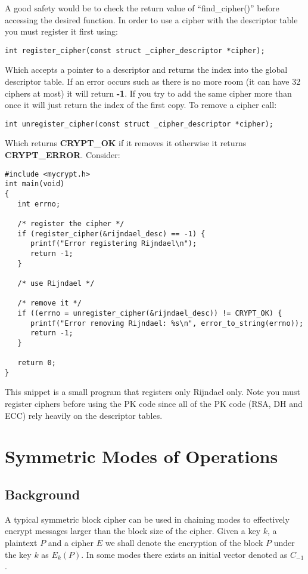 \documentclass[b5paper]{book}
\begin{document}
A good safety would be to check the return value of ``find\_cipher()'' before accessing the desired function.  In order
to use a cipher with the descriptor table you must register it first using:
\begin{verbatim}
int register_cipher(const struct _cipher_descriptor *cipher);
\end{verbatim}
Which accepts a pointer to a descriptor and returns the index into the global descriptor table.  If an error occurs such
as there is no more room (it can have 32 ciphers at most) it will return {\bf{-1}}.  If you try to add the same cipher more
than once it will just return the index of the first copy.  To remove a cipher call:
\begin{verbatim}
int unregister_cipher(const struct _cipher_descriptor *cipher);
\end{verbatim}
Which returns {\bf CRYPT\_OK} if it removes it otherwise it returns {\bf CRYPT\_ERROR}.  Consider:
\begin{small}
\begin{verbatim}
#include <mycrypt.h>
int main(void)
{
   int errno;
   
   /* register the cipher */
   if (register_cipher(&rijndael_desc) == -1) {
      printf("Error registering Rijndael\n");
      return -1;
   }

   /* use Rijndael */

   /* remove it */
   if ((errno = unregister_cipher(&rijndael_desc)) != CRYPT_OK) {
      printf("Error removing Rijndael: %s\n", error_to_string(errno));
      return -1;
   }

   return 0;
}
\end{verbatim}
\end{small}
This snippet is a small program that registers only Rijndael only.  Note you must register ciphers before
using the PK code since all of the PK code (RSA, DH and ECC) rely heavily on the descriptor tables.

\section{Symmetric Modes of Operations}
\subsection{Background}
A typical symmetric block cipher can be used in chaining modes to effectively encrypt messages larger than the block
size of the cipher.  Given a key $k$, a plaintext $P$ and a cipher $E$ we shall denote the encryption of the block
$P$ under the key $k$ as $E_k(P)$.  In some modes there exists an initial vector denoted as $C_{-1}$.
\end{document}
